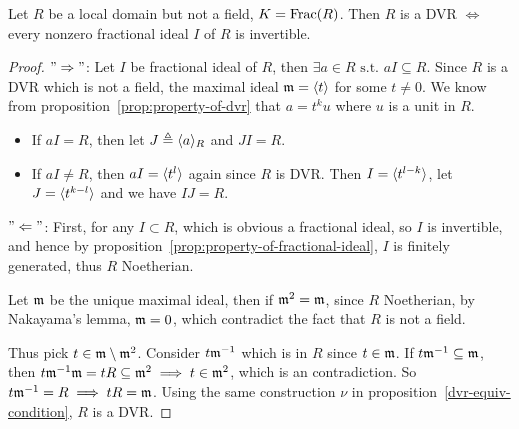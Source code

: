 \begin{prop} \label{prop:equvalence-of-dvr-with-fractional-ideal}
    Let $R$ be a local domain but not a field, $K = \operatorname{Frac}(R)$.
      Then $R$ is a DVR $\iff$ every nonzero fractional ideal $I$ of $R$ is
      invertible.
      \begin{proof}
        $"\Rightarrow"$:
        Let $I$ be fractional ideal of $R$,
        then $\exists a \in R \text{ s.t. } aI \subseteq R$.
        Since $R$ is a DVR which is not a field,
        the maximal ideal $\mathfrak{m} = \langle t\rangle$ for some $t \ne 0$.
        We know from proposition~\ref{prop:property-of-dvr}
        that $a = t^k u$ where $u$ is a unit in $R$.
        \begin{itemize}
          \item If $aI = R$, then let $J \triangleq \langle a\rangle_R$ and $JI = R$.
          \item If $aI \ne R$, then $aI = \langle t^l\rangle$ again since $R$
            is DVR. Then $I = \langle t^{l-k}\rangle$, let $J = \langle t^{k-l}\rangle$
            and we have $IJ = R$.
        \end{itemize}

        $"\Leftarrow"$:
        First, for any $I \subset R$, which is obvious a fractional ideal,
        so $I$ is invertible, and hence by proposition~\ref{prop:property-of-fractional-ideal},
        $I$ is finitely generated, thus $R$ Noetherian.

        Let $\mathfrak{m}$ be the unique maximal ideal, then if $\mathfrak{m}^2 = \mathfrak{m}$,
        since $R$ Noetherian, by Nakayama's lemma, $\mathfrak{m} = 0$,
        which contradict the fact that $R$ is not a field.

        Thus pick $t \in \mathfrak{m} \setminus \mathfrak{m}^2$. Consider $t \mathfrak{m}^{-1}$
        which is in $R$ since $t \in \mathfrak{m}$.
        If $t \mathfrak{m}^{-1} \subseteq \mathfrak{m}$, then $t \mathfrak{m}^{-1} \mathfrak{m} = t R \subseteq \mathfrak{m}^2 \implies
        t \in \mathfrak{m}^2$, which is an contradiction. So $t \mathfrak{m}^{-1} = R \implies tR = \mathfrak{m}$.
        Using the same construction $\nu$ in proposition~\ref{dvr-equiv-condition},
        $R$ is a DVR.
      \end{proof}
\end{prop}

